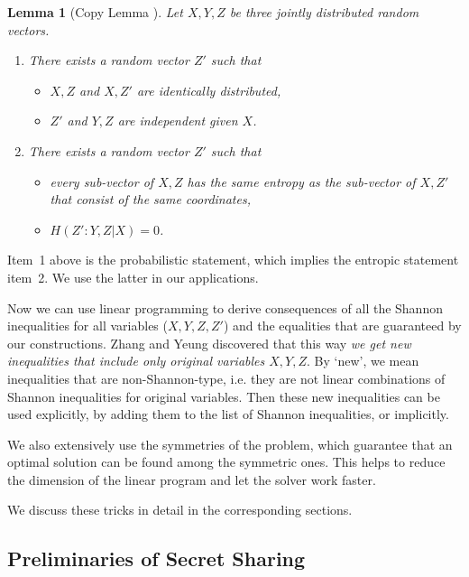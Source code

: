 \documentclass[11pt, a4paper]{kybernetika}
\newtheorem{lemma}[theorem]{Lemma}
\begin{document}
	\begin{lemma}[Copy Lemma \cite{zhang1998characterization,dougherty2011non}]
		Let $X,Y,Z$ be three jointly distributed random vectors.
		\begin{enumerate}
			\item There exists a random vector $Z'$ such that
			\begin{itemize}
				\item $X,Z$ and $X,Z'$ are identically distributed,
				\item $Z'$ and $Y,Z$ are independent given $X$.
			\end{itemize}
			\item There exists a random vector $Z'$ such that
			\begin{itemize}
				\item every sub-vector of $X,Z$ has the same entropy as the sub-vector of $X,Z'$ that consist of the same coordinates,
				\item $H(Z':Y,Z|X)=0$.
			\end{itemize}
		\end{enumerate}
	\end{lemma}
	
	Item~1 above is the probabilistic statement, which implies the entropic statement item~2. We use the latter in our applications.
	
	Now we can use linear programming to derive consequences of all the Shannon inequalities for all variables ($X,Y,Z,Z'$) and the equalities that are guaranteed by our constructions. Zhang and Yeung \cite{zhang1998characterization} discovered that this way \emph{we get new inequalities that include only original variables $X,Y,Z$}. By `new', we mean inequalities that are non-Shannon-type, i.e. they are not linear combinations of Shannon inequalities for original variables. Then these new inequalities can be used explicitly, by adding them to the list of Shannon inequalities, or implicitly.
	
	We also extensively use the symmetries of the problem, which guarantee that an optimal solution can be found among the symmetric ones. This helps to reduce the dimension of the linear program and let the solver work faster.
	
	We discuss these tricks in detail in the corresponding sections.
	
	\subsection{Preliminaries of Secret Sharing}
	
\end{document}
